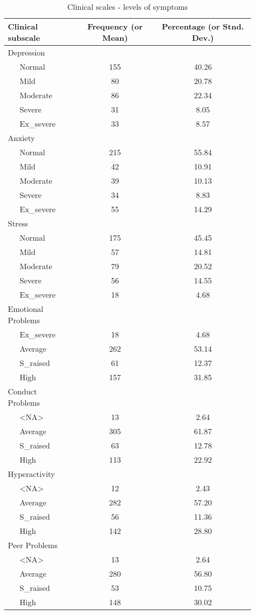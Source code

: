 \documentclass[
  english,
  man]{apa6}
\begin{document}
\begin{table}[tbp]

\begin{center}
\begin{threeparttable}

\caption{\label{tab:clindesctable}Clinical scales - levels of symptoms}

\small{

\begin{tabular}{lcc}
\toprule
Clinical subscale & Frequency (or Mean) & Percentage (or Stnd. Dev.)\\
\midrule
Depression &  & \\
\ \ \ Normal & 155 & 40.26\\
\ \ \ Mild & 80 & 20.78\\
\ \ \ Moderate & 86 & 22.34\\
\ \ \ Severe & 31 & 8.05\\
\ \ \ Ex\_severe & 33 & 8.57\\
Anxiety &  & \\
\ \ \ Normal & 215 & 55.84\\
\ \ \ Mild & 42 & 10.91\\
\ \ \ Moderate & 39 & 10.13\\
\ \ \ Severe & 34 & 8.83\\
\ \ \ Ex\_severe & 55 & 14.29\\
Stress &  & \\
\ \ \ Normal & 175 & 45.45\\
\ \ \ Mild & 57 & 14.81\\
\ \ \ Moderate & 79 & 20.52\\
\ \ \ Severe & 56 & 14.55\\
\ \ \ Ex\_severe & 18 & 4.68\\
Emotional Problems &  & \\
\ \ \ Ex\_severe & 18 & 4.68\\
\ \ \ Average & 262 & 53.14\\
\ \ \ S\_raised & 61 & 12.37\\
\ \ \ High & 157 & 31.85\\
Conduct Problems &  & \\
\ \ \ <NA> & 13 & 2.64\\
\ \ \ Average & 305 & 61.87\\
\ \ \ S\_raised & 63 & 12.78\\
\ \ \ High & 113 & 22.92\\
Hyperactivity &  & \\
\ \ \ <NA> & 12 & 2.43\\
\ \ \ Average & 282 & 57.20\\
\ \ \ S\_raised & 56 & 11.36\\
\ \ \ High & 142 & 28.80\\
Peer Problems &  & \\
\ \ \ <NA> & 13 & 2.64\\
\ \ \ Average & 280 & 56.80\\
\ \ \ S\_raised & 53 & 10.75\\
\ \ \ High & 148 & 30.02\\
\bottomrule
\end{tabular}

}
\end{threeparttable}
\end{center}
\end{table}
\end{document}
